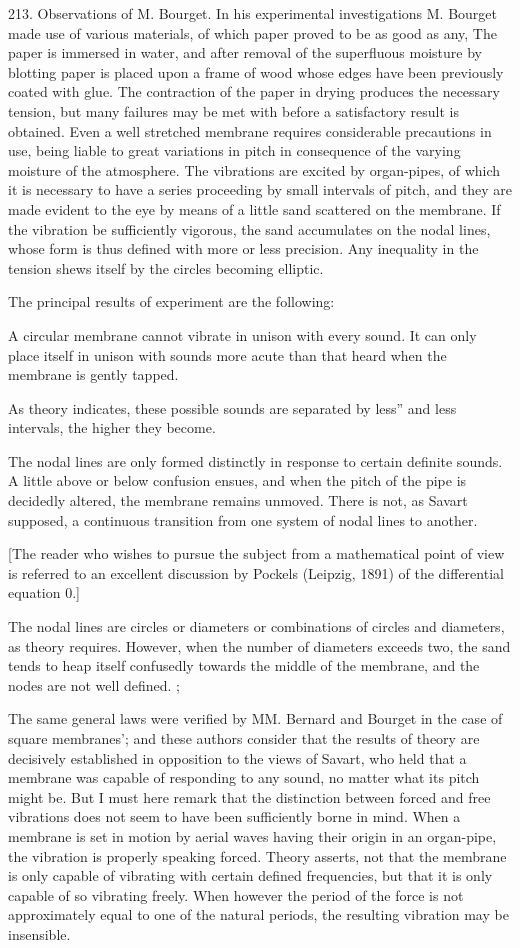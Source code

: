 213.  Observations of M. Bourget.
In his experimental investigations M. Bourget made use of various
materials, of which paper proved to be as good as any, The paper is
immersed in water, and after removal of the superfluous moisture by
blotting paper is placed upon a frame of wood whose edges have been
previously coated with glue. The contraction of the paper in drying
produces the necessary tension, but many failures may be met with before
a satisfactory result is obtained. Even a well stretched membrane
requires considerable precautions in use, being liable to great
variations in pitch in consequence of the varying moisture of the
atmosphere. The vibrations are excited by organ-pipes, of which it is
necessary to have a series proceeding by small intervals of pitch, and
they are made evident to the eye by means of a little sand scattered on
the membrane. If the vibration be sufficiently vigorous, the sand
accumulates on the nodal lines, whose form is thus defined with more or
less precision. Any inequality in the tension shews itself by the
circles becoming elliptic.

The principal results of experiment are the following:

A circular membrane cannot vibrate in unison with every sound. It can
only place itself in unison with sounds more acute than that heard when
the membrane is gently tapped.

As theory indicates, these possible sounds are separated by less'' and
less intervals, the higher they become.

The nodal lines are only formed distinctly in response to certain
definite sounds. A little above or below confusion ensues, and when the
pitch of the pipe is decidedly altered, the membrane remains unmoved.
There is not, as Savart supposed, a continuous transition from one
system of nodal lines to another.

[The reader who wishes to pursue the subject from a mathematical point of
view is referred to an excellent discussion by Pockels (Leipzig, 1891) of the
differential equation 0.]


The nodal lines are circles or diameters or combinations of circles and
diameters, as theory requires. However, when the number of diameters
exceeds two, the sand tends to heap itself confusedly towards the middle
of the membrane, and the nodes are not well defined. ;

The same general laws were verified by MM. Bernard and Bourget in the
case of square membranes'; and these authors consider that the results
of theory are decisively established in opposition to the views of
Savart, who held that a membrane was capable of responding to any sound,
no matter what its pitch might be. But I must here remark that the
distinction between forced and free vibrations does not seem to have
been sufficiently borne in mind. When a membrane is set in motion by
aerial waves having their origin in an organ-pipe, the vibration is
properly speaking forced. Theory asserts, not that the membrane is only
capable of vibrating with certain defined frequencies, but that it is
only capable of so vibrating freely. When however the period of the
force is not approximately equal to one of the natural periods, the
resulting vibration may be insensible.

